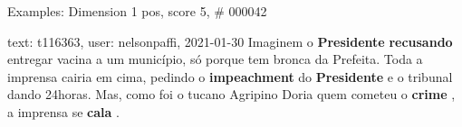 \begin{frame}{Examples: Dimension 1 pos, score 5, \# 000042}
\footnotesize
\begin{exampleblock}{text: t116363, user: nelsonpaffi, 2021-01-30}
Imaginem o \textbf{Presidente} \textbf{recusando} entregar vacina a um 
município, só porque tem bronca da Prefeita. Toda a imprensa cairia em cima, 
pedindo o \textbf{impeachment} do \textbf{Presidente} e o tribunal dando 
24horas. Mas, como foi o tucano Agripino Doria quem cometeu o \textbf{crime} , 
a imprensa se \textbf{cala} . 
\end{exampleblock}
\end{frame}
